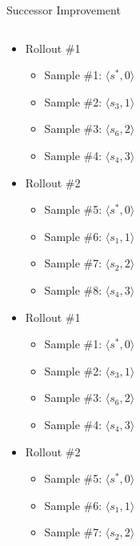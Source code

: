 \documentclass{gkibeamer}
\begin{document}
\begin{frame}{Successor Improvement}
\begin{columns}
\begin{column}{0.5\textwidth}
 {
    \begin{itemize}
        \item Rollout \#1
        \begin{itemize}
            \item Sample \#1: $\langle s^*, 0 \rangle$
            \item Sample \#2: $\langle s_3, 1 \rangle$
            \item Sample \#3: $\langle s_6, 2 \rangle$
            \item Sample \#4: $\langle s_4, 3 \rangle$
        \end{itemize}
    \end{itemize}
}
 {
    \begin{itemize}
        \item Rollout \#2
        \begin{itemize}
            \item Sample \#5: $\langle s^*, 0 \rangle$
            \item Sample \#6: $\langle s_1, 1 \rangle$
            \item Sample \#7: $\langle s_2, 2 \rangle$
            \item Sample \#8: $\langle s_4, 3 \rangle$
        \end{itemize}
    \end{itemize}
}
 {
    \begin{itemize}
        \item Rollout \#1
        \begin{itemize}
            \item Sample \#1: $\langle s^*, 0 \rangle$
            \item Sample \#2: $\langle s_3, 1 \rangle$
            \item Sample \#3: $\langle s_6, 2 \rangle$
            \item Sample \#4: $\langle s_4, 3 \rangle$
        \end{itemize}
        \item Rollout \#2
        \begin{itemize}
            \item Sample \#5: $\langle s^*, 0 \rangle$
            \item Sample \#6: $\langle s_1, 1 \rangle$
            \item Sample \#7: $\langle s_2, 2 \rangle$

\end{itemize}
\end{itemize}}
\end{column}
\end{columns}
\end{frame}
\end{document}

